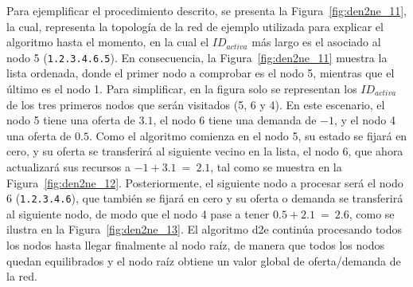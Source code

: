 Para ejemplificar el procedimiento descrito, se presenta la Figura~\ref{fig:den2ne_11}, la cual, representa la topología de la red de ejemplo utilizada para explicar el algoritmo hasta el momento, en la cual el $ID_{activa}$ más largo es el asociado al nodo 5 (\texttt{1.2.3.4.6.5}). En consecuencia, la Figura~\ref{fig:den2ne_11} muestra la lista ordenada, donde el primer nodo a comprobar es el nodo 5, mientras que el último es el nodo 1. Para simplificar, en la figura solo se representan los $ID_{activa}$ de los tres primeros nodos que serán visitados (5, 6 y 4). En este escenario, el nodo 5 tiene una oferta de $3.1$, el nodo 6 tiene una demanda de $-1$, y el nodo 4 una oferta de $0.5$. Como el algoritmo comienza en el nodo 5, su estado se fijará en cero, y su oferta se transferirá al siguiente vecino en la lista, el nodo 6, que ahora actualizará sus recursos a $-1+3.1 \:= \:2.1$, tal como se muestra en la Figura~\ref{fig:den2ne_12}. Posteriormente, el siguiente nodo a procesar será el nodo 6 (\texttt{1.2.3.4.6}), que también se fijará en cero y su oferta o demanda se transferirá al siguiente nodo, de modo que el nodo 4 pase a tener $0.5+2.1 \: = \: 2.6$, como se ilustra en la Figura~\ref{fig:den2ne_13}. El algoritmo \gls{d2e} continúa procesando todos los nodos hasta llegar finalmente al nodo raíz, de manera que todos los nodos quedan equilibrados y el nodo raíz obtiene un valor global de oferta/demanda de la red.



